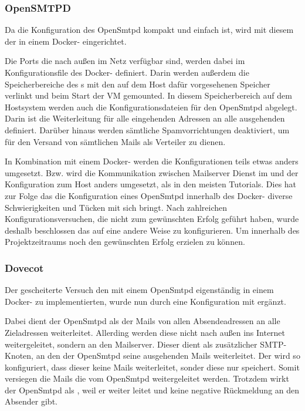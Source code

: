 \documentclass[a4paper,11pt,singlespacing]{article}
\begin{document}
		\subsubsection{OpenSMTPD}\label{OpenRelayOpenSMTPD}
			Da die Konfiguration des \textsf{OpenSmtpd} kompakt und einfach ist, wird mit diesem der  in einem Docker- eingerichtet.
			
			Die Ports die nach außen im Netz verfügbar sind, werden dabei im Konfigurationsfile des Docker- definiert. Darin werden außerdem die Speicherbereiche des s mit den auf dem Host dafür vorgesehenen Speicher verlinkt und beim Start der VM gemounted. In diesem Speicherbereich auf dem Hostsystem werden auch die Konfigurationsdateien für den \textsf{OpenSmtpd} abgelegt. Darin ist die Weiterleitung für alle eingehenden Adressen an alle ausgehenden definiert. Darüber hinaus werden sämtliche Spamvorrichtungen deaktiviert, um für den Versand von sämtlichen Mails als Verteiler zu dienen.
			
			In Kombination mit einem Docker- werden die Konfigurationen teils etwas anders umgesetzt. Bzw. wird die Kommunikation zwischen Mailserver Dienst im  und der  Konfiguration zum Host anders umgesetzt, als in den meisten Tutorials. Dies hat zur Folge das die Konfiguration eines \textsf{OpenSmtpd} innerhalb des Docker- diverse Schwierigkeiten und Tücken mit sich bringt. 
			Nach zahlreichen Konfigurationsversuchen, die nicht zum gewünschten Erfolg geführt haben, wurde deshalb beschlossen das  auf eine andere Weise zu konfigurieren. Um innerhalb des Projektzeitraums noch den gewünschten Erfolg erzielen zu können.
			
		\subsubsection{Dovecot}\label{OpenRelayDovecot}
			Der gescheiterte Versuch den  mit einem \textsf{OpenSmtpd} eigenständig in einem Docker- zu implementierten, wurde nun durch eine Konfiguration mit  ergänzt.
			
			Dabei dient der \textsf{OpenSmtpd} als  der Mails von allen Absendeadressen an alle Zieladressen weiterleitet. Allerding werden diese nicht nach außen ins Internet weitergeleitet, sondern an den  Mailserver. Dieser dient als zusätzlicher SMTP-Knoten, an den der \textsf{OpenSmtpd} seine ausgehenden Mails weiterleitet. Der  wird so konfiguriert, dass dieser keine Mails weiterleitet, sonder diese nur speichert. Somit versiegen die Mails die vom \textsf{OpenSmtpd} weitergeleitet werden. Trotzdem wirkt der \textsf{OpenSmtpd} als , weil er weiter leitet und keine negative Rückmeldung an den Absender gibt.
			
\end{document}
